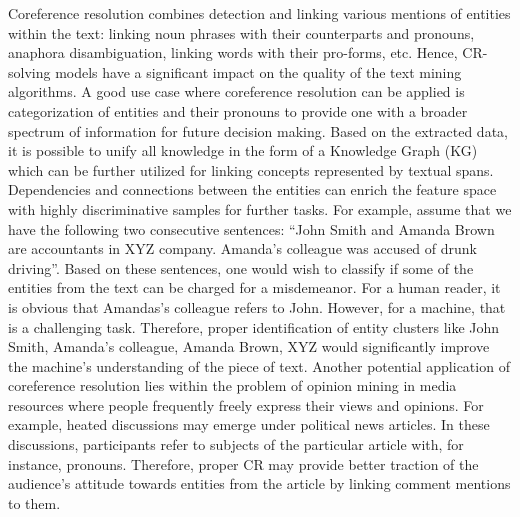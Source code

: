 Coreference resolution combines detection and linking various mentions of entities within the text: linking noun phrases with their counterparts and pronouns, anaphora disambiguation, linking words with their pro-forms, etc.  
Hence, CR-solving models have a significant impact on the quality of the text mining algorithms. 
A good use case where coreference resolution can be applied is categorization of entities and their pronouns to provide one with a broader spectrum of information for future decision making. Based on the extracted data, it is possible to unify all knowledge in the form of a Knowledge Graph (KG) \cite{kg-Wang2017} which can be further utilized for linking concepts represented by textual spans. 
Dependencies and connections between the entities can enrich the feature space with highly discriminative samples for further tasks. 
For example, assume that we have the following two consecutive sentences: “John Smith and Amanda Brown are accountants in XYZ company. Amanda’s colleague was accused of drunk driving”. Based on these sentences, one would wish to classify if some of the entities from the text can be charged for a misdemeanor. 
For a human reader, it is obvious that Amandas’s colleague refers to John. However, for a machine, that is a challenging task. Therefore, proper identification of entity clusters like {John Smith, Amanda’s colleague}, {Amanda Brown}, {XYZ} would significantly improve the machine’s understanding of the piece of text.
Another potential application of coreference resolution lies within the problem of opinion mining in media resources where people frequently freely express their views and opinions.
For example, heated discussions may emerge under political news articles. In these discussions, participants refer to subjects of the particular article with, for instance, pronouns. Therefore, proper CR may provide better traction of the audience's attitude towards entities from the article by linking comment mentions to them.  



